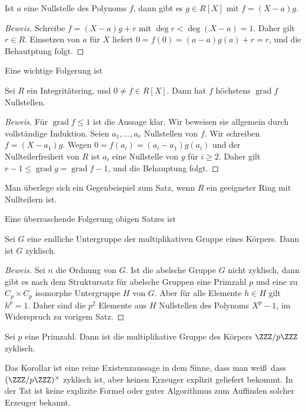 \documentclass[12pt,a4paper,twoside]{article}
\DeclareMathOperator{\grad}{grad}
\begin{document}
\begin{Satz}
  Ist $a$ eine Nullstelle des Polynoms $f$, dann gibt es $g\in R[X]$ mit
  $f=(X-a)g$.
\end{Satz}
\begin{proof}[Beweis]
  Schreibe $f=(X-a)g+r$ mit $\deg r<\deg(X-a)=1$. Daher gilt $r\in
  R$. Einsetzen von $a$ f\"ur $X$ liefert $0=f(0)=(a-a)g(a)+r=r$, und die
  Behautptung folgt.
\end{proof}
Eine wichtige Folgerung ist
\begin{Satz}\label{S:Nullstellen}
  Sei $R$ ein Integrit\"atsring, und $0\ne f\in R[X]$. Dann hat $f$
  h\"ochstens $\grad f$ Nullstellen.
\end{Satz}
\begin{proof}[Beweis]
  F\"ur $\grad f\le 1$ ist die Aussage klar. Wir beweisen sie allgemein durch
  vollst\"andige Induktion. Seien $a_1,\dots,a_r$ Nullstellen von
  $f$. Wir schreiben $f=(X-a_1)g$. Wegen $0=f(a_i)=(a_i-a_1)g(a_i)$ und der
  Nullteilerfreiheit von $R$ ist $a_i$ eine Nullstelle von $g$ f\"ur $i\ge
  2$. Daher gilt $r-1\le\grad g=\grad f-1$, und die Behauptung folgt.
\end{proof}
\begin{Bemerkung*}
  Man \"uberlege sich ein Gegenbeispiel zum Satz, wenn $R$ ein geeigneter Ring
  mit Nullteilern ist.
\end{Bemerkung*}
Eine \"uberraschende Folgerung obigen Satzes ist
\begin{Satz}
  Sei $G$ eine endliche Untergruppe der multiplikativen Gruppe eines
  K\"orpers. Dann ist $G$ zyklisch.
\end{Satz}
\begin{proof}[Beweis]
  Sei $n$ die Ordnung von $G$. Ist die abelsche Gruppe $G$ nicht zyklisch,
  dann gibt es nach dem Struktursatz f\"ur abelsche Gruppen eine Primzahl $p$
  und eine zu $C_p\times C_p$ isomorphe Untergruppe $H$ von $G$. Aber f\"ur
  alle Elemente $h\in H$ gilt $h^p=1$. Daher sind die $p^2$ Elemente aus $H$
  Nullstellen des Polynoms $X^p-1$, im Widerspruch zu vorigem Satz.
\end{proof}
\begin{Korollar}\label{K:ZpZzyklisch}
  Sei $p$ eine Primzahl. Dann ist die multiplikative Gruppe des K\"orpers
  $\ZZZ/p\ZZZ$ zyklisch.
\end{Korollar}
\begin{Bemerkung*}
  Das Korollar ist eine reine Existenzaussage in dem Sinne, dass man wei\ss\,
  dass $(\ZZZ/p\ZZZ)^\times$ zyklisch ist, aber keinen Erzeuger explizit
  geliefert bekommt. In der Tat ist keine explizite Formel oder guter
  Algorithmus zum Auffinden solcher Erzeuger bekannt.
\end{Bemerkung*}
\end{document}
